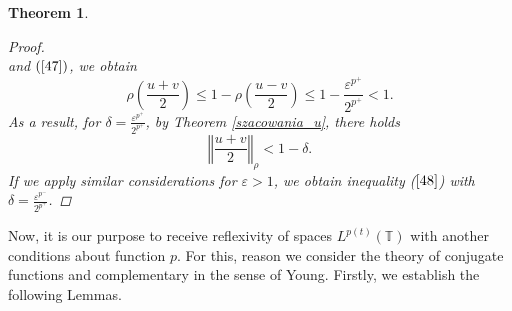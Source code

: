 \documentclass[12pt,a4paper,oneside,titlepage]{article}
\newtheorem{Twierdzenie}{Theorem}
\renewcommand{\epsilon}{\varepsilon}
\begin{document}
\begin{Twierdzenie}
\begin{proof}
\begin{equation}
\end{equation}
and $(\ref{47})$, we obtain
\begin{equation}
\nonumber
\rho\left( \frac{u+v}{2} \right) \leq 1 - \rho \left( \frac{u-v}{2} \right) \leq 1 - \frac{\epsilon^{p^+}}{2^{p^+}} < 1.
\end{equation}
As a result, for $\delta=\frac{\epsilon^{p^+}}{2^{p^+}}$, by Theorem \ref{szacowania_u}, there holds
\begin{equation}
\label{48}
\left\Vert \frac{u+v}{2} \right\Vert_{\rho} < 1 - \delta.
\end{equation}
If we apply similar considerations for $\epsilon>1$, we obtain inequality ($\ref{48}$) with $\delta=\frac{\epsilon^{p^-}}{2^{p^+}} $.


\end{proof}
\end{Twierdzenie}




\indent
 Now, it is our purpose to receive reflexivity of spaces $L^{p(t)}(\mathbb{T})$ with another conditions about function $p$. For this, reason we consider the theory of conjugate functions and complementary in the sense of Young. Firstly, we establish the following Lemmas.
\end{document}
